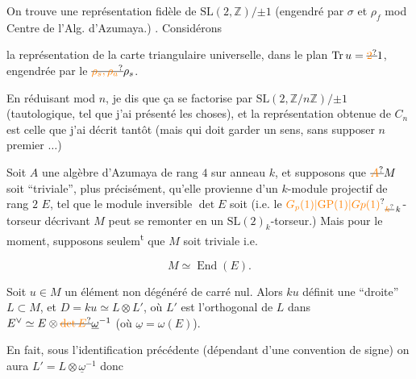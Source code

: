 On trouve une représentation fidèle de $\mathrm{SL}(2,\mathbb Z)/{\pm1}$  (engendré par $\sigma$ et $\rho_f$ mod Centre de l'Alg. d'Azumaya.) . Considérons

 la représentation de la carte triangulaire universelle, dans le plan   $\operatorname{Tr}u=\deleted{\unsure{2}}1$, engendrée par le  $\deleted{\unsure{\rho_s,\rho_a}}\rho_s$. 


En réduisant mod $n$, je dis que ça se factorise par $\mathrm{SL}(2,\mathbb Z/n\mathbb Z)/{\pm1}$ (tautologique, tel que j'ai présenté les choses), et la représentation obtenue de $C_n$ est celle que j'ai décrit tantôt (mais qui doit garder un sens, sans supposer $n$ premier $\ldots$)

Soit $A$ une algèbre d'Azumaya de rang $4$ sur anneau $k$, et supposons que $\deleted{\unsure{A}}M$ soit ``triviale'', plus précisément, qu'elle provienne d'un $k$-module projectif de rang $2$ $E$, tel que le module inversible $\det E$ soit  (i.e. le  $\unsure{G_p(1)|\mathrm{GP}(1)|Gp(1)}_{\deleted{\unsure{k}}\,k}$-torseur décrivant $M$ peut se remonter en un $\mathrm{SL}(2)_k$-torseur.) Mais pour le moment, supposons seulem\textsuperscript{t} que $M$ soit triviale i.e.

\[
 M\simeq\operatorname{End}(E).
\]

Soit $u\in M$ un élément non dégénéré de carré nul. Alors $ku$ définit une ``droite'' $L\subset M$, et $D=ku\simeq L\otimes L'$, où $L'$ est l'orthogonal de $L$ dans $E^\vee\simeq E\otimes\deleted{\unsure{\det E}}\underline{\omega}^{-1}$ (où $\underline{\omega}=\omega(E)$).

 En fait, sous l'identification précédente (dépendant d'une convention de signe) on aura $L'=L\otimes\underline{\omega}^{-1}$ donc

